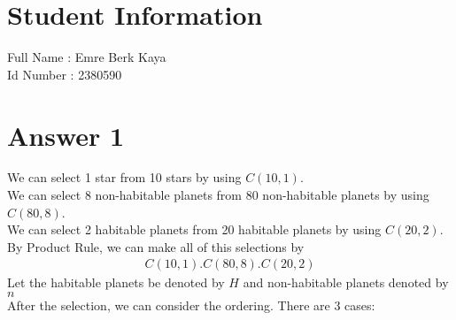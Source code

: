 \documentclass[11pt]{article}
\begin{document}
\section*{Student Information } 
Full Name : Emre Berk Kaya \\
Id Number : 2380590 \\
\doublespacing
\section*{Answer 1}

    We can select 1 star from 10 stars by using $C(10,1)$.\\
    We can select 8 non-habitable planets from 80 non-habitable planets by using $C(80,8)$. \\
    We can select 2 habitable planets from 20 habitable planets by using $C(20,2)$. \\
    By Product Rule, we can make all of this selections by 
    \begin{gather*}
        C(10,1).C(80,8).C(20,2)
    \end{gather*} 
    Let the habitable planets be denoted by $H$ and non-habitable planets denoted by $n$ \\
    After the selection, we can consider the ordering. There are 3 cases:
\end{document}
